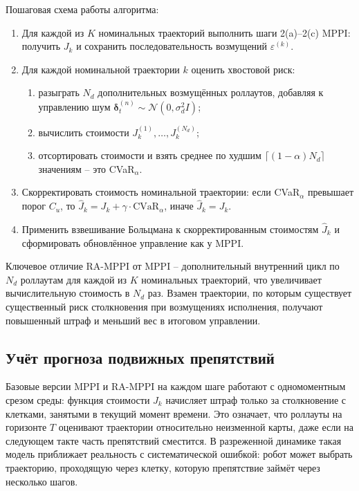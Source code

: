 \documentclass[a4paper,12pt]{extarticle}
\begin{document}
    Пошаговая схема работы алгоритма:
    \begin{enumerate}
        \item Для каждой из $K$ номинальных траекторий выполнить шаги 2(a)--2(c) MPPI: получить $J_k$ и сохранить последовательность возмущений $\varepsilon^{(k)}$.
        \item Для каждой номинальной траектории $k$ оценить хвостовой риск:
            \begin{enumerate}
                \item разыграть $N_d$ дополнительных возмущённых роллаутов, добавляя к управлению шум $\boldsymbol{\delta}_t^{(n)} \sim \mathcal{N}(0, \sigma_d^2 I)$;
                \item вычислить стоимости $J_k^{(1)}, \dots, J_k^{(N_d)}$;
                \item отсортировать стоимости и взять среднее по худшим $\lceil (1-\alpha) N_d \rceil$ значениям -- это CVaR$_\alpha$.
            \end{enumerate}
        \item Скорректировать стоимость номинальной траектории: если CVaR$_\alpha$ превышает порог $C_u$, то $\widehat{J}_k = J_k + \gamma \cdot \mathrm{CVaR}_\alpha$, иначе $\widehat{J}_k = J_k$.
        \item Применить взвешивание Больцмана к скорректированным стоимостям $\widehat{J}_k$ и сформировать обновлённое управление как у MPPI.
    \end{enumerate}

    Ключевое отличие RA-MPPI от MPPI -- дополнительный внутренний цикл по $N_d$ роллаутам для каждой из $K$ номинальных траекторий, что увеличивает вычислительную стоимость в $N_d$ раз. Взамен траектории, по которым существует существенный риск столкновения при возмущениях исполнения, получают повышенный штраф и меньший вес в итоговом управлении.

    \subsection{Учёт прогноза подвижных препятствий}

    Базовые версии MPPI и RA-MPPI на каждом шаге работают с одномоментным срезом среды:
    функция стоимости $J_k$ начисляет штраф только за столкновение с клетками, занятыми
    в текущий момент времени. Это означает, что роллауты на горизонте $T$ оценивают траектории
    относительно неизменной карты, даже если на следующем такте часть препятствий сместится.
    В разреженной динамике такая модель приближает реальность с систематической ошибкой:
    робот может выбрать траекторию, проходящую через клетку, которую препятствие займёт через
    несколько шагов.
\end{document}
